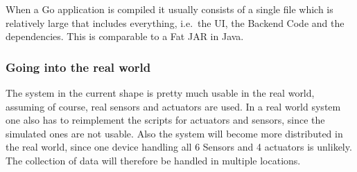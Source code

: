 When a Go application is compiled it usually consists of a single file
which is relatively large that includes everything, i.e.~the UI, the
Backend Code and the dependencies.
This is comparable to a Fat JAR in Java.


\subsubsection{Going into the real
world}\label{going-into-the-real-world}

The system in the current shape is pretty much usable in the real world,
assuming of course, real sensors and actuators are used.
In a real world
system one also has to reimplement the scripts for actuators and
sensors, since the simulated ones are not usable.
Also the system will
become more distributed in the real world, since one device handling all
6 Sensors and 4 actuators is unlikely.
The collection of data will
therefore be handled in multiple locations.
